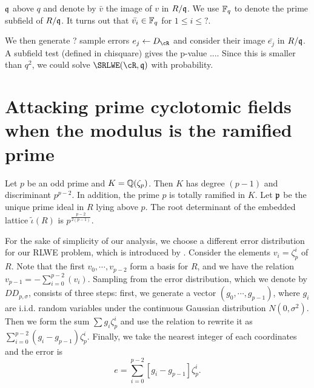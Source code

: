 \documentclass{amsart}
\begin{document}
$\mathfrak{q}$ above $q$ and denote by $\bar{v}$ the image of $v$ in $R/\mathfrak{q}$. We use $\mathbb{F}_q$ to denote the prime subfield of $R/\mathfrak{q}$. It turns out that $\bar{v_i} \in \mathbb{F}_q$ for $1 \leq i \leq ?$.

We then generate ? sample errors $e_j \gets D_{\cR}$ and consider their image $\bar{e_j}$ in $R/\mathfrak{q}$. A subfield test (defined in chisquare) gives the p-value .... Since this is smaller than $q^2$, we could solve $\SRLWE(\cR,\fq)$ with probability.






\section{Attacking prime cyclotomic fields when the modulus is the ramified prime}
\label{sec: ramified-prime}

Let $p$ be an odd prime and $K = \mathbb{Q}(\zeta_p)$. Then $K$ has degree $(p-1)$ and discriminant $p^{p-2}$.
In addition, the prime $p$ is totally ramified in $K$. Let $\mathfrak{p}$ be the unique prime ideal  in $R$ lying above $p$. The root determinant of the embedded lattice $\tilde{\iota}(R)$ is $p^{\frac{p-2}{2(p-1)}}$.




For the sake of simplicity of our analysis, we choose a different error distribution for our RLWE problem, which is introduced by \cite{ducas2012ring}. Consider the elements $v_i = \zeta_p^{i}$ of $R$. Note that the first $v_0, \cdots, v_{p-2}$ form a basis for $R$, and we have the relation
$v_{p-1} = -\sum_{i=0}^{p-2}(v_i)$. Sampling from the \cite{ducas2012ring} error distribution, which we denote by $DD_{p,\sigma}$, consists of three steps: first, we generate a vector $(g_0, \cdots, g_{p-1})$, where $g_i$ are i.i.d. random variables under the continuous Gaussian distribution $N(0,\sigma^2)$. Then we form the sum
$\sum g_i \zeta_p^i$ and use the relation to rewrite it as $\sum_{i=0}^{p-2} (g_i - g_{p-1}) \zeta_p^i$.
Finally, we take the nearest integer of each coordinates and the error is $$e  = \sum_{i=0}^{p-2} [g_i - g_{p-1}] \zeta_p^i.$$
\end{document}

